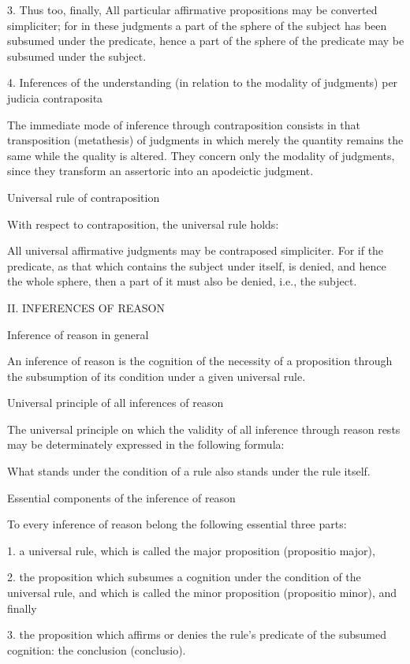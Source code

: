 3.  Thus too, finally,
    All particular affirmative propositions may be converted simpliciter;
    for in these judgments a part of the sphere of the subject
    has been subsumed under the predicate,
    hence a part of the sphere of the predicate
    may be subsumed under the subject.

4. Inferences of the understanding
(in relation to the modality of judgments)
per judicia contraposita

The immediate mode of inference through contraposition
consists in that transposition (metathesis) of judgments
in which merely the quantity remains the same
while the quality is altered.
They concern only the modality of judgments,
since they transform an assertoric into an apodeictic judgment.

Universal rule of contraposition

With respect to contraposition, the universal rule holds:

All universal affirmative judgments may be contraposed simpliciter.
For if the predicate, as that which contains the subject under itself,
is denied, and hence the whole sphere,
then a part of it must also be denied,
i.e., the subject.

II. INFERENCES OF REASON

Inference of reason in general

An inference of reason is the cognition of the necessity of a proposition
through the subsumption of its condition under a given universal rule.

Universal principle of all inferences of reason

The universal principle on which the validity of
all inference through reason rests may be
determinately expressed in the following formula:

What stands under the condition of a rule
also stands under the rule itself.

Essential components of the inference of reason

To every inference of reason belong the following essential three parts:

1.  a universal rule, which is called the major proposition
    (propositio major),

2.  the proposition which subsumes a cognition
    under the condition of the universal rule,
    and which is called the minor proposition
    (propositio minor), and finally

3.  the proposition which affirms or denies
    the rule's predicate of the subsumed cognition:
    the conclusion (conclusio).

